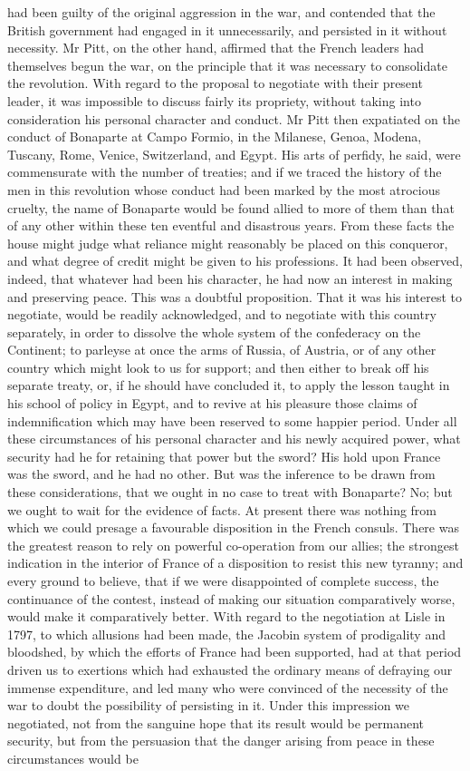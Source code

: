 \documentclass{article}
\begin{document}
had been guilty of the original aggression in the war, and contended that the British government had engaged in it unnecessarily, and persisted in it without necessity. Mr Pitt, on the other hand, affirmed that the French leaders had themselves begun the war, on the principle that it was necessary to consolidate the revolution. With regard to the proposal to negotiate with their present leader, it was impossible to discuss fairly its propriety, without taking into consideration his personal character and conduct. Mr Pitt then expatiated on the conduct of Bonaparte at Campo Formio, in the Milanese, Genoa, Modena, Tuscany, Rome, Venice, Switzerland, and Egypt. His arts of perfidy, he said, were commensurate with the number of treaties; and if we traced the history of the men in this revolution whose conduct had been marked by the most atrocious cruelty, the name of Bonaparte would be found allied to more of them than that of any other within these ten eventful and disastrous years. From these facts the house might judge what reliance might reasonably be placed on this conqueror, and what degree of credit might be given to his professions. It had been observed, indeed, that whatever had been his character, he had now an interest in making and preserving peace. This was a doubtful proposition. That it was his interest to negotiate, would be readily acknowledged, and to negotiate with this country separately, in order to dissolve the whole system of the confederacy on the Continent; to parleyse at once the arms of Russia, of Austria, or of any other country which might look to us for support; and then either to break off his separate treaty, or, if he should have concluded it, to apply the lesson taught in his school of policy in Egypt, and to revive at his pleasure those claims of indemnification which may have been reserved to some happier period. Under all these circumstances of his personal character and his newly acquired power, what security had he for retaining that power but the sword? His hold upon France was the sword, and he had no other. But was the inference to be drawn from these considerations, that we ought in no case to treat with Bonaparte? No; but we ought to wait for the evidence of facts. At present there was nothing from which we could presage a favourable disposition in the French consuls. There was the greatest reason to rely on powerful co-operation from our allies; the strongest indication in the interior of France of a disposition to resist this new tyranny; and every ground to believe, that if we were disappointed of complete success, the continuance of the contest, instead of making our situation comparatively worse, would make it comparatively better. With regard to the negotiation at Lisle in 1797, to which allusions had been made, the Jacobin system of prodigality and bloodshed, by which the efforts of France had been supported, had at that period driven us to exertions which had exhausted the ordinary means of defraying our immense expenditure, and led many who were convinced of the necessity of the war to doubt the possibility of persisting in it. Under this impression we negotiated, not from the sanguine hope that its result would be permanent security, but from the persuasion that the danger arising from peace in these circumstances would be 
\end{document}

